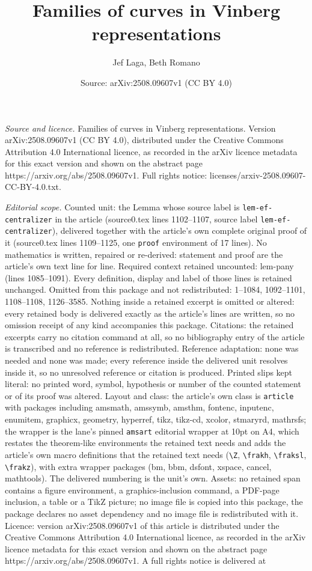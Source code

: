 \documentclass[10pt,a4paper]{amsart}
\title[Families of curves in Vinberg representations]{Families of curves in Vinberg representations}
\author{Jef Laga, Beth Romano}
\date{Source: arXiv:2508.09607v1 (CC BY 4.0)}
\begin{document}
\maketitle

\noindent\emph{Source and licence.} Families of curves in Vinberg representations. Version arXiv:2508.09607v1 (CC BY 4.0), distributed under the Creative Commons Attribution 4.0 International licence, as recorded in the arXiv licence metadata for this exact version and shown on the abstract page https://arxiv.org/abs/2508.09607v1. Full rights notice: licenses/arxiv-2508.09607-CC-BY-4.0.txt.\par\smallskip

\noindent\textit{Editorial scope.} Counted unit: the Lemma whose source label is \texttt{lem-ef-centralizer} in the article (source0.tex lines 1102--1107, source label \texttt{lem-ef-centralizer}), delivered together with the article's own complete original proof of it (source0.tex lines 1109--1125, one \texttt{proof} environment of 17 lines). No mathematics is written, repaired or re-derived: statement and proof are the article's own text line for line. Required context retained uncounted: lem-pany (lines 1085--1091). Every definition, display and label of those lines is retained unchanged. Omitted from this package and not redistributed: 1--1084, 1092--1101, 1108--1108, 1126--3585. Nothing inside a retained excerpt is omitted or altered: every retained body is delivered exactly as the article's lines are written, so no omission receipt of any kind accompanies this package. Citations: the retained excerpts carry no citation command at all, so no bibliography entry of the article is transcribed and no reference is redistributed. Reference adaptation: none was needed and none was made; every reference inside the delivered unit resolves inside it, so no unresolved reference or citation is produced. Printed slips kept literal: no printed word, symbol, hypothesis or number of the counted statement or of its proof was altered. Layout and class: the article's own class is \texttt{article} with packages including amsmath, amssymb, amsthm, fontenc, inputenc, enumitem, graphicx, geometry, hyperref, tikz, tikz-cd, xcolor, stmaryrd, mathrsfs; the wrapper is the lane's pinned \texttt{amsart} editorial wrapper at 10pt on A4, which restates the theorem-like environments the retained text needs and adds the article's own macro definitions that the retained text needs (\texttt{\textbackslash Z}, \texttt{\textbackslash frakh}, \texttt{\textbackslash fraksl}, \texttt{\textbackslash frakz}), with extra wrapper packages (bm, bbm, dsfont, xspace, cancel, mathtools). The delivered numbering is the unit's own. Assets: no retained span contains a figure environment, a graphics-inclusion command, a PDF-page inclusion, a table or a TikZ picture; no image file is copied into this package, the package declares no asset dependency and no image file is redistributed with it. Licence: version arXiv:2508.09607v1 of this article is distributed under the Creative Commons Attribution 4.0 International licence, as recorded in the arXiv licence metadata for this exact version and shown on the abstract page https://arxiv.org/abs/2508.09607v1. A full rights notice is delivered at 
\end{document}
